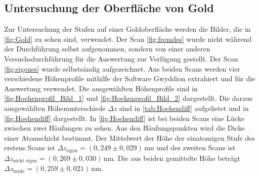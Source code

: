 \subsection{Untersuchung der Oberfläche von Gold}
Zur Untersuchung der Stufen auf einer Goldoberfläche werden die Bilder, die in \autoref{fig:Gold} zu sehen sind, verwendet. Der Scan \ref{fig:fremdes} wurde nicht während der Durchführung selbst aufgenommen, sondern von einer anderen Versuchsdurchführung für die Auswertung zur Verfügung gestellt. Der Scan \ref{fig:eigenes} wurde selbstsändig aufgezeichnet. Aus beiden Scans werden vier verschiedene Höhenprofile mithilfe der Software Gwyddion extrahiert und für die Auswertung verwendet. Die ausgewählten Höhenprofile sind in \autoref{fig:Hoehenprofil_Bild_1} und \autoref{fig:Hoehenprofil_Bild_2} dargestellt. Die daraus ausgewählten Höhenunterschiede $\Delta z$ sind in \autoref{tab:Hoehendiff} aufgelistet und in \autoref{fig:Hoehendiff} dargestellt.
In \autoref{fig:Hoehendiff} ist bei beiden Scans eine Lücke zwischen zwei Häufungen zu sehen. Aus den Häufungspunkten wird die Dicke einer Atomschicht bestimmt. Der Mittelwert der Höhe der einatomigen Stufe des erstens Scans ist $\Delta z_{\text{eigen}} = (0,249 \pm 0,029) \,  \unit{\nano\meter}$ und des zweiten Scans ist $\Delta z_{\text{nicht eigen}} = (0,269 \pm 0,030)\,  \unit{\nano\meter}$. Die aus beiden gemittelte Höhe beträgt $\Delta z_{\text{beide}} = (0,259 \pm 0,021)\,  \unit{\nano\meter}$.


